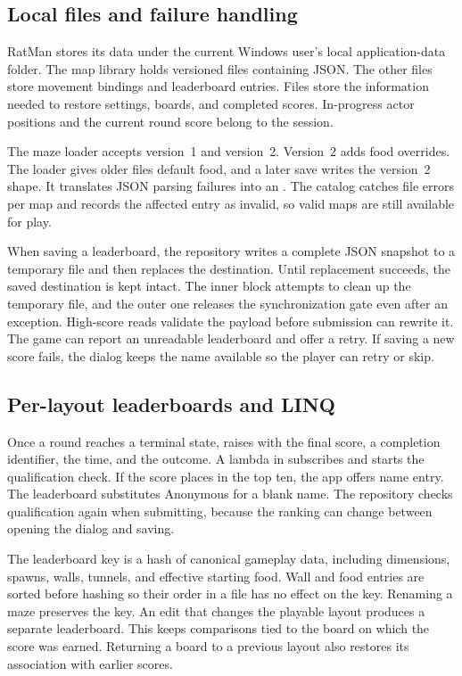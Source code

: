 \subsection{Local files and failure handling}

RatMan stores its data under the current Windows user's local application-data folder. The map library holds versioned  files containing JSON. The other files store movement bindings and leaderboard entries. Files store the information needed to restore settings, boards, and completed scores. In-progress actor positions and the current round score belong to the session.

The maze loader accepts version~1 and version~2. Version~2 adds food overrides. The loader gives older files default food, and a later save writes the version~2 shape. It translates JSON parsing failures into an . The catalog catches file errors per map and records the affected entry as invalid, so valid maps are still available for play.

When saving a leaderboard, the repository writes a complete JSON snapshot to a temporary file and then replaces the destination. Until replacement succeeds, the saved destination is kept intact. The inner  block attempts to clean up the temporary file, and the outer one releases the synchronization gate even after an exception. High-score reads validate the payload before submission can rewrite it. The game can report an unreadable leaderboard and offer a retry. If saving a new score fails, the dialog keeps the name available so the player can retry or skip.

\subsection{Per-layout leaderboards and LINQ}

Once a round reaches a terminal state,  raises  with the final score, a completion identifier, the time, and the outcome. A lambda in  subscribes and starts the qualification check. If the score places in the top ten, the app offers name entry. The leaderboard substitutes Anonymous for a blank name. The repository checks qualification again when submitting, because the ranking can change between opening the dialog and saving.

The leaderboard key is a hash of canonical gameplay data, including dimensions, spawns, walls, tunnels, and effective starting food. Wall and food entries are sorted before hashing so their order in a file has no effect on the key. Renaming a maze preserves the key. An edit that changes the playable layout produces a separate leaderboard. This keeps comparisons tied to the board on which the score was earned. Returning a board to a previous layout also restores its association with earlier scores.

